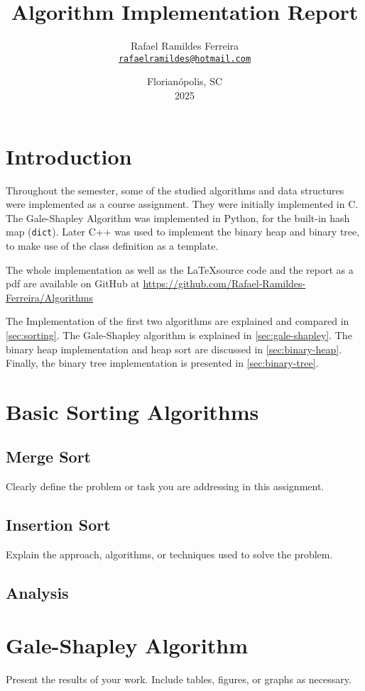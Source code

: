 \documentclass[a4paper,12pt,twocolumn]{article}
\title{Algorithm Implementation Report}
\author{Rafael Ramildes Ferreira \\ \href{mailto:rafaelramildes@hotmail.com}{\texttt{rafaelramildes@hotmail.com}}}
\date{Florianópolis, SC \\ 2025}
\begin{document}
\maketitle

\section*{Introduction}

Throughout the semester, some of the studied algorithms and data structures were implemented as a course assignment. They were initially implemented in C. The Gale-Shapley Algorithm was implemented in Python, for the built-in hash map (\texttt{dict}). Later C++ was used to implement the binary heap and binary tree, to make use of the class definition as a template.

The whole implementation as well as the \LaTeX source code and the report as a pdf are available on GitHub at \url{https://github.com/Rafael-Ramildes-Ferreira/Algorithms}

The Implementation of the first two algorithms are explained and compared in \autoref{sec:sorting}. The Gale-Shapley algorithm is explained in \autoref{sec:gale-shapley}. The binary heap implementation and heap sort are discussed in \autoref{sec:binary-heap}. Finally, the binary tree implementation is presented in \autoref{sec:binary-tree}.

\section{Basic Sorting Algorithms}
\label{sec:sorting}
\subsection{Merge Sort}
Clearly define the problem or task you are addressing in this assignment.

\subsection{Insertion Sort}
Explain the approach, algorithms, or techniques used to solve the problem.

\subsection{Analysis}


\section{Gale-Shapley Algorithm}
\label{sec:gale-shapley}
Present the results of your work. Include tables, figures, or graphs as necessary.
\end{document}
